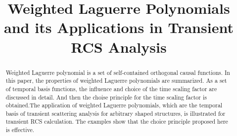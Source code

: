 \documentclass[conference, a4paper]{IEEEtran}
\begin{document}
\title{Weighted Laguerre Polynomials and its Applications in Transient RCS
Analysis}





% 
\author{
}




\maketitle

\begin{abstract}
Weighted Laguerre polynomial is a set of self-contained orthogonal
causal functions. In this paper, the properties of weighted Laguerre
polynomials are summarized. As a set of temporal basis functions, the
influence and choice of the time scaling factor are discussed in detail.
And then the choise principle for the time scaling factor is obtained.The
application of weighted Laguerre polynomials, which are  the temporal
basis of transient scattering analysis for arbitrary shaped structures,
is illustrated for transient RCS calculation. The examples show that the choice
principle proposed here is effective.
\end{abstract}
\end{document}
